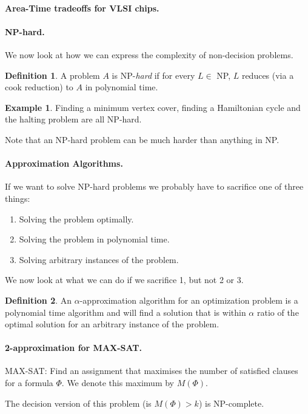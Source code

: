 \documentclass[11pt,a4paper]{article}
\theoremstyle{definition}
\newtheorem{defn}{Definition}
\newtheorem*{ex}{Example}
\begin{document}
\paragraph{Area-Time tradeoffs for VLSI chips.}

\paragraph{NP-hard.}
We now look at how we can express the complexity of non-decision problems.
\begin{defn}
A problem $A$ is NP-\emph{hard} if for every $L\in$ NP, $L$ reduces (via a cook reduction) to $A$ in polynomial time.
\end{defn}
\begin{ex}
Finding a minimum vertex cover, finding a Hamiltonian cycle and the halting problem are all NP-hard.
\end{ex}
Note that an NP-hard problem can be much harder than anything in NP.

\paragraph{Approximation Algorithms.}
If we want to solve NP-hard problems we probably have to sacrifice one of three things:
\begin{enumerate}
\item Solving the problem optimally.
\item Solving the problem in polynomial time.
\item Solving arbitrary instances of the problem.
\end{enumerate}

We now look at what we can do if we sacrifice 1, but not 2 or 3.

\begin{defn}
An $\alpha$-approximation algorithm for an optimization problem is a polynomial time algorithm and will find a solution that is within $\alpha$ ratio of the optimal solution for an arbitrary instance of the problem.
\end{defn}

\paragraph{2-approximation for MAX-SAT.}
MAX-SAT: Find an assignment that maximises the number of satisfied clauses for a formula $\Phi$.
We denote this maximum by $M(\Phi)$.

The decision version of this problem (is $M(\Phi) > k$) is NP-complete.
\end{document}
